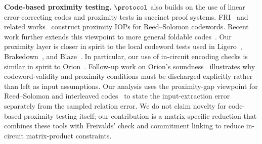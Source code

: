 \noindent\textbf{Code-based proximity testing.}
\(\protocol\) also builds on the use of linear error-correcting codes and proximity
tests in succinct proof systems. FRI~\cite{FRI} and related
works~\cite{STIR,WHIR} construct proximity IOPs for
Reed--Solomon codewords. Recent work further extends this viewpoint to more
general foldable codes~\cite{basefold}.
Our proximity layer is closer in spirit to the local codeword tests used in
Ligero~\cite{Ligero}, Brakedown~\cite{golovnev2023brakedown}, and
Blaze~\cite{blaze}. In particular, our use of in-circuit encoding checks is
similar in spirit to Orion~\cite{orion}. Follow-up work on Orion's
soundness~\cite{restoring_orion} illustrates why codeword-validity and
proximity conditions must be discharged explicitly rather than left as input
assumptions.  Our analysis uses the proximity-gap viewpoint for
Reed--Solomon and interleaved codes~\cite{bensasson2023proximity,diamond2024interleaved}
to state the input-extraction error separately from the sampled relation error.
We do not claim novelty for code-based proximity testing itself;
our contribution is a matrix-specific reduction that combines these tools with
Freivalds' check and commitment linking to reduce in-circuit matrix-product
constraints.



